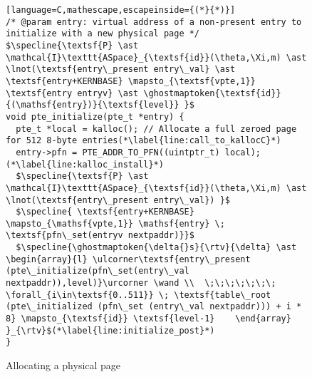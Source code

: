 \begin{figure}\footnotesize
  \begin{lstlisting}[language=C,mathescape,escapeinside={(*}{*)}]
/* @param entry: virtual address of a non-present entry to initialize with a new physical page */
$\specline{\textsf{P} \ast \mathcal{I}\texttt{ASpace}_{\textsf{id}}(\theta,\Xi,m) \ast \lnot(\textsf{entry\_present entry\_val} \ast \textsf{entry+KERNBASE} \mapsto_{\textsf{vpte,1}} \textsf{entry entryv} \ast \ghostmaptoken{\textsf{id}}{(\mathsf{entry})}{\textsf{level}} }$
void pte_initialize(pte_t *entry) {
  pte_t *local = kalloc(); // Allocate a full zeroed page for 512 8-byte entries(*\label{line:call_to_kallocC}*)
  entry->pfn = PTE_ADDR_TO_PFN((uintptr_t) local);(*\label{line:kalloc_install}*)
  $\specline{\textsf{P} \ast \mathcal{I}\texttt{ASpace}_{\textsf{id}}(\theta,\Xi,m) \ast \lnot(\textsf{entry\_present entry\_val}) }$
  $\specline{ \textsf{entry+KERNBASE} \mapsto_{\mathsf{vpte,1}} \mathsf{entry} \; \textsf{pfn\_set(entryv nextpaddr)}}$
  $\specline{\ghostmaptoken{\delta{}s}{\rtv}{\delta} \ast \begin{array}{l} \ulcorner\textsf{entry\_present (pte\_initialize(pfn\_set(entry\_val nextpaddr)),level)}\urcorner \wand \\  \;\;\;\;\;\;\; \forall_{i\in\textsf{0..511}} \; \textsf{table\_root (pte\_initialized (pfn\_set (entry\_val nextpaddr))) + i * 8} \mapsto_{\textsf{id}} \textsf{level-1}    \end{array}  }_{\rtv}$(*\label{line:initialize_post}*)
}
\end{lstlisting}
\vspace{-2em}
\caption{Allocating a physical page }
\label{pteinitializespecC}
\vspace{-1em}
\end{figure}

